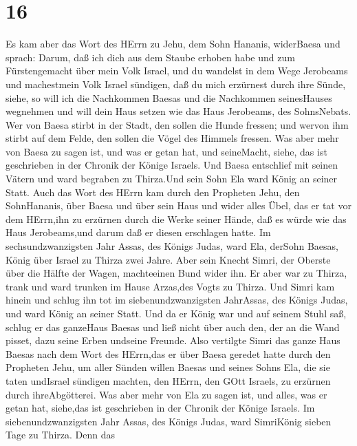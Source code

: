 \hypertarget{section-15}{%
\section{16}\label{section-15}}

 Es kam aber das Wort des HErrn zu Jehu, dem Sohn Hananis,
widerBaesa und sprach:  Darum, daß ich dich aus dem Staube
erhoben habe und zum Fürstengemacht über mein Volk Israel, und du
wandelst in dem Wege Jerobeams und machestmein Volk Israel sündigen, daß
du mich erzürnest durch ihre Sünde,  siehe, so will ich die
Nachkommen Baesas und die Nachkommen seinesHauses wegnehmen und will
dein Haus setzen wie das Haus Jerobeams, des SohnsNebats. 
Wer von Baesa stirbt in der Stadt, den sollen die Hunde fressen; und
wervon ihm stirbt auf dem Felde, den sollen die Vögel des Himmels
fressen.  Was aber mehr von Baesa zu sagen ist, und was er
getan hat, und seineMacht, siehe, das ist geschrieben in der Chronik der
Könige Israels.  Und Baesa entschlief mit seinen Vätern und
ward begraben zu Thirza.Und sein Sohn Ela ward König an seiner Statt.
 Auch das Wort des HErrn kam durch den Propheten Jehu, den
SohnHananis, über Baesa und über sein Haus und wider alles Übel, das er
tat vor dem HErrn,ihn zu erzürnen durch die Werke seiner Hände, daß es
würde wie das Haus Jerobeams,und darum daß er diesen erschlagen hatte.
 Im sechsundzwanzigsten Jahr Assas, des Königs Judas, ward
Ela, derSohn Baesas, König über Israel zu Thirza zwei Jahre.
 Aber sein Knecht Simri, der Oberste über die Hälfte der
Wagen, machteeinen Bund wider ihn. Er aber war zu Thirza, trank und ward
trunken im Hause Arzas,des Vogts zu Thirza.  Und Simri kam
hinein und schlug ihn tot im siebenundzwanzigsten JahrAssas, des Königs
Judas, und ward König an seiner Statt.  Und da er König war
und auf seinem Stuhl saß, schlug er das ganzeHaus Baesas und ließ nicht
über auch den, der an die Wand pisset, dazu seine Erben undseine
Freunde.  Also vertilgte Simri das ganze Haus Baesas nach
dem Wort des HErrn,das er über Baesa geredet hatte durch den Propheten
Jehu,  um aller Sünden willen Baesas und seines Sohns Ela,
die sie taten undIsrael sündigen machten, den HErrn, den GOtt Israels,
zu erzürnen durch ihreAbgötterei.  Was aber mehr von Ela zu
sagen ist, und alles, was er getan hat, siehe,das ist geschrieben in der
Chronik der Könige Israels.  Im siebenundzwanzigsten Jahr
Assas, des Königs Judas, ward SimriKönig sieben Tage zu Thirza. Denn das
